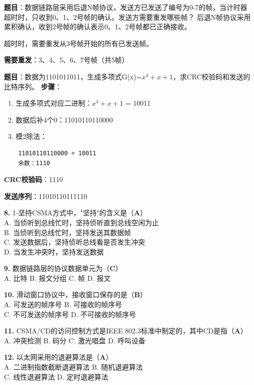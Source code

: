 \begin{examplebox}
\textbf{题目}：数据链路层采用后退N帧协议，发送方已发送了编号为0-7的帧，当计时器超时时，只收到0、1、2号帧的确认。发送方需要重发哪些帧？
\tcblower
后退N帧协议采用累积确认，收到2号帧的确认表示0、1、2号帧都已正确接收。

超时时，需要重发从3号帧开始的所有已发送帧。

\textbf{需要重发}：3、4、5、6、7号帧（共5帧）
\end{examplebox}

\begin{examplebox}
\textbf{题目}：数据为1101011011，生成多项式G(x)=$x^4+x+1$，求CRC校验码和发送的比特序列。
\tcblower
\textbf{步骤}：
\begin{enumerate}[itemsep=0pt]
    \item 生成多项式对应二进制：$x^4+x+1$ = 10011
    \item 数据后补4个0：11010110110000
    \item 模2除法：
\end{enumerate}

\begin{verbatim}
    11010110110000 ÷ 10011
    余数：1110
\end{verbatim}

\textbf{CRC校验码}：1110

\textbf{发送序列}：11010110111110
\end{examplebox}

\begin{examplebox}[选择题（补充）]
\textbf{8.} 1-坚持CSMA方式中，"坚持"的含义是（\textbf{A}）\\
A. 当侦听到总线忙时，坚持侦听直到总线空闲为止\\
B. 当侦听到总线忙时，坚持发送其数据帧\\
C. 发送数据后，坚持侦听总线看是否发生冲突\\
D. 当发生冲突时，坚持发送数据

\textbf{9.} 数据链路层的协议数据单元为（\textbf{C}）\\
A. 比特 \quad B. 报文分组 \quad C. 帧 \quad D. 报文

\textbf{10.} 滑动窗口协议中，接收窗口保存的是（\textbf{B}）\\
A. 可发送的帧序号 \quad B. 可接收的帧序号\\
C. 不可发送的帧序号 \quad D. 不可接收的帧序号

\textbf{11.} CSMA/CD的访问控制方式是IEEE 802.3标准中制定的，其中CD是指（\textbf{A}）\\
A. 冲突检测 \quad B. 码分 \quad C. 激光唱盘 \quad D. 呼叫设备

\textbf{12.} 以太网采用的退避算法是（\textbf{A}）\\
A. 二进制指数截断退避算法 \quad B. 随机退避算法\\
C. 线性退避算法 \quad D. 定时退避算法
\end{examplebox}

